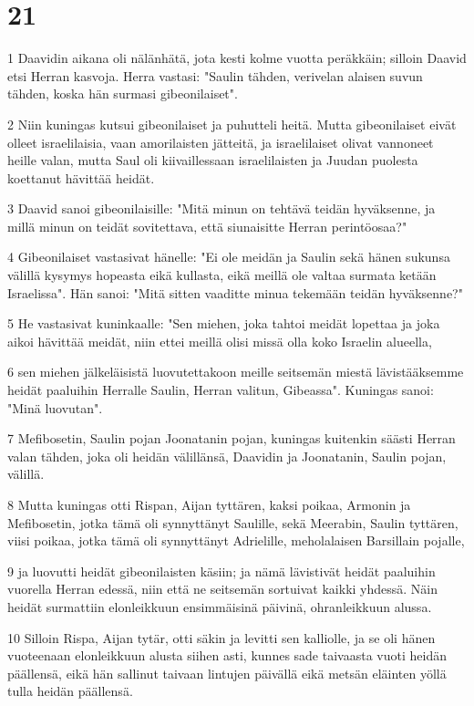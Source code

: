 \chapter{21}

\par 1 Daavidin aikana oli nälänhätä, jota kesti kolme vuotta peräkkäin; silloin Daavid etsi Herran kasvoja. Herra vastasi: "Saulin tähden, verivelan alaisen suvun tähden, koska hän surmasi gibeonilaiset".
\par 2 Niin kuningas kutsui gibeonilaiset ja puhutteli heitä. Mutta gibeonilaiset eivät olleet israelilaisia, vaan amorilaisten jätteitä, ja israelilaiset olivat vannoneet heille valan, mutta Saul oli kiivaillessaan israelilaisten ja Juudan puolesta koettanut hävittää heidät.
\par 3 Daavid sanoi gibeonilaisille: "Mitä minun on tehtävä teidän hyväksenne, ja millä minun on teidät sovitettava, että siunaisitte Herran perintöosaa?"
\par 4 Gibeonilaiset vastasivat hänelle: "Ei ole meidän ja Saulin sekä hänen sukunsa välillä kysymys hopeasta eikä kullasta, eikä meillä ole valtaa surmata ketään Israelissa". Hän sanoi: "Mitä sitten vaaditte minua tekemään teidän hyväksenne?"
\par 5 He vastasivat kuninkaalle: "Sen miehen, joka tahtoi meidät lopettaa ja joka aikoi hävittää meidät, niin ettei meillä olisi missä olla koko Israelin alueella,
\par 6 sen miehen jälkeläisistä luovutettakoon meille seitsemän miestä lävistääksemme heidät paaluihin Herralle Saulin, Herran valitun, Gibeassa". Kuningas sanoi: "Minä luovutan".
\par 7 Mefibosetin, Saulin pojan Joonatanin pojan, kuningas kuitenkin säästi Herran valan tähden, joka oli heidän välillänsä, Daavidin ja Joonatanin, Saulin pojan, välillä.
\par 8 Mutta kuningas otti Rispan, Aijan tyttären, kaksi poikaa, Armonin ja Mefibosetin, jotka tämä oli synnyttänyt Saulille, sekä Meerabin, Saulin tyttären, viisi poikaa, jotka tämä oli synnyttänyt Adrielille, meholalaisen Barsillain pojalle,
\par 9 ja luovutti heidät gibeonilaisten käsiin; ja nämä lävistivät heidät paaluihin vuorella Herran edessä, niin että ne seitsemän sortuivat kaikki yhdessä. Näin heidät surmattiin elonleikkuun ensimmäisinä päivinä, ohranleikkuun alussa.
\par 10 Silloin Rispa, Aijan tytär, otti säkin ja levitti sen kalliolle, ja se oli hänen vuoteenaan elonleikkuun alusta siihen asti, kunnes sade taivaasta vuoti heidän päällensä, eikä hän sallinut taivaan lintujen päivällä eikä metsän eläinten yöllä tulla heidän päällensä.
